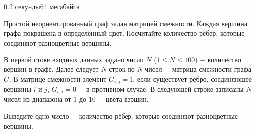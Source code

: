 \begin{problem}{}{}{}{0.2 секунды}{64 мегабайта}

Простой неориентированный граф задан матрицей смежности. Каждая вершина графа покрашена в определённый цвет.
Посчитайте количество рёбер, которые соединяют разноцветные вершины.

\InputFile
В первой стоке входных данных задано число $N$ ($1 \le N \le 100$) $-$ количество вершин в графе.
Далее следует $N$ строк по $N$ чисел $-$ матрица смежности графа $G$. В матрице смежности элемент $G_{i,j}=1$, если
существует ребро, соединяющее вершины $i$ и $j$, $G_{i,j}=0$ $-$ в противном случае.
В следующей строке записаны $N$ чисел из диапазона от $1$ до $10$ $-$ цвета вершин.

\OutputFile
Выведите одно число $-$ количество рёбер, которые соединяют разноцветные вершины.

\Example

\begin{example}
%
\end{example}

\end{problem}

